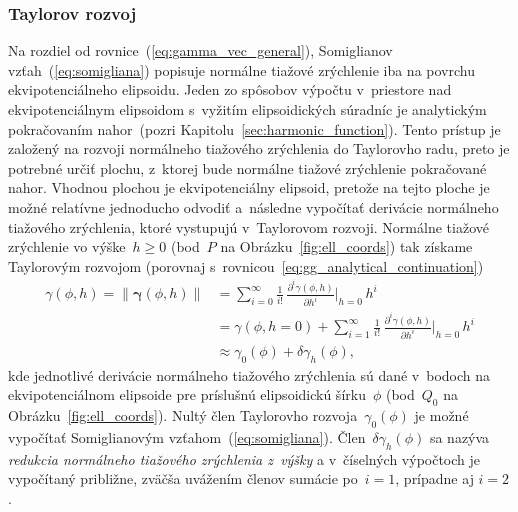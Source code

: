 \documentclass[a4paper,12pt]{book}
\begin{document}
\subsubsection{Taylorov rozvoj}

Na rozdiel od rovnice~(\ref{eq:gamma_vec_general}), Somiglianov 
vzťah~(\ref{eq:somigliana}) popisuje normálne tiažové zrýchlenie iba na povrchu 
ekvipotenciálneho elipsoidu.  Jeden zo spôsobov výpočtu v~priestore nad 
ekvipotenciálnym elipsoidom s~vyžitím elipsoidických súradníc je analytickým 
pokračovaním nahor~(pozri Kapitolu~\ref{sec:harmonic_function}).  Tento prístup 
je založený na rozvoji normálneho tiažového zrýchlenia do Taylorovho radu, 
preto je potrebné určiť plochu, z~ktorej bude normálne tiažové zrýchlenie 
pokračované nahor.  Vhodnou plochou je ekvipotenciálny elipsoid, pretože na 
tejto ploche je možné relatívne jednoducho odvodiť a~následne vypočítať 
derivácie normálneho tiažového zrýchlenia, ktoré vystupujú v~Taylorovom 
rozvoji.  Normálne tiažové zrýchlenie vo výške~$h \geq 0$ (bod~$P$ na 
Obrázku~\ref{fig:ell_coords}) tak získame Taylorovým rozvojom (porovnaj 
s~rovnicou~\ref{eq:gg_analytical_continuation})
%
\begin{equation}
\label{eq:gamma_taylor}
\begin{split}
\gamma(\phi, h) = \| \boldsymbol \gamma(\phi, h) \| &= \sum_{i = 0}^{\infty} 
\frac{1}{i!} \, \frac{\partial^i \gamma(\phi, h)}{\partial h^i} \bigg\lvert_{h 
= 0} \, h^i\\
%
&= \gamma(\phi, h = 0) + \sum_{i = 1}^{\infty} \frac{1}{i!} \, \frac{\partial^i 
\gamma(\phi, h)}{\partial h^i} \bigg\lvert_{h = 0} \, h^i\\
%
&\approx \gamma_0(\phi) + \delta\gamma_h(\phi){,}
\end{split}
\end{equation}
%
kde jednotlivé derivácie normálneho tiažového zrýchlenia sú dané v~bodoch na 
ekvipotenciálnom elipsoide pre príslušnú elipsoidickú šírku~$\phi$ (bod~$Q_0$ 
na Obrázku~\ref{fig:ell_coords}).  Nultý člen Taylorovho 
rozvoja~$\gamma_0(\phi)$ je možné vypočítať Somiglianovým 
vzťahom~(\ref{eq:somigliana}).  Člen~$\delta\gamma_h(\phi)$ sa nazýva 
\emph{redukcia normálneho tiažového zrýchlenia z~výšky} a v~číselných výpočtoch 
je vypočítaný približne, zväčša uvážením členov sumácie po~$i = 1$, prípadne aj 
$i = 2$.
\end{document}
